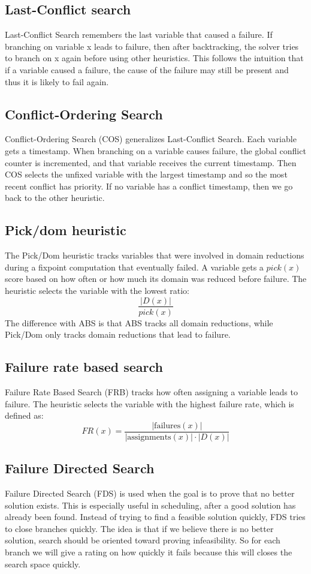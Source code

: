\documentclass[12pt, openany]{report}
\theoremstyle{definition}
\begin{document}
\subsection{Last-Conflict search}
Last-Conflict Search remembers the last variable that caused a failure. If branching on variable x leads to failure, then after backtracking, the solver tries to branch on x again before using other heuristics. This follows the intuition that if a variable caused a failure, the cause of the failure may still be present and thus it is likely to fail again.
\subsection{Conflict-Ordering Search}
Conflict-Ordering Search (COS) generalizes Last-Conflict Search. Each variable gets a timestamp. When branching on a variable causes failure, the global conflict counter is incremented, and that variable receives the current timestamp.
Then COS selects the unfixed variable with the largest timestamp and so the most recent conflict has priority. If no variable has a conflict timestamp, then we go back to the other heuristic.
\subsection{Pick/dom heuristic}
The Pick/Dom heuristic tracks variables that were involved in domain reductions during a fixpoint computation that eventually failed. A variable gets a $pick(x)$ score based on how often or how much its domain was reduced before failure. The heuristic selects the variable with the lowest ratio:
\begin{equation}
    \frac{|D(x)|}{pick(x)}
\end{equation} 
The difference with ABS is that ABS tracks all domain reductions, while Pick/Dom only tracks domain reductions that lead to failure.
\subsection{Failure rate based search}
Failure Rate Based Search (FRB) tracks how often assigning a variable leads to failure. The heuristic selects the variable with the highest failure rate, which is defined as:
\begin{equation}
    FR(x) = \frac{|\text{failures}(x)|}{|\text{assignments}(x)| \cdot |D(x)|}
\end{equation}
\subsection{Failure Directed Search}
Failure Directed Search (FDS) is used when the goal is to prove that no better solution exists. This is especially useful in scheduling, after a good solution has already been found. Instead of trying to find a feasible solution quickly, FDS tries to close branches quickly. The idea is that if we believe there is no better solution, search should be oriented toward proving infeasibility. So for each branch we will give a rating on how quickly it fails because this will closes the search space quickly.
\end{document}
